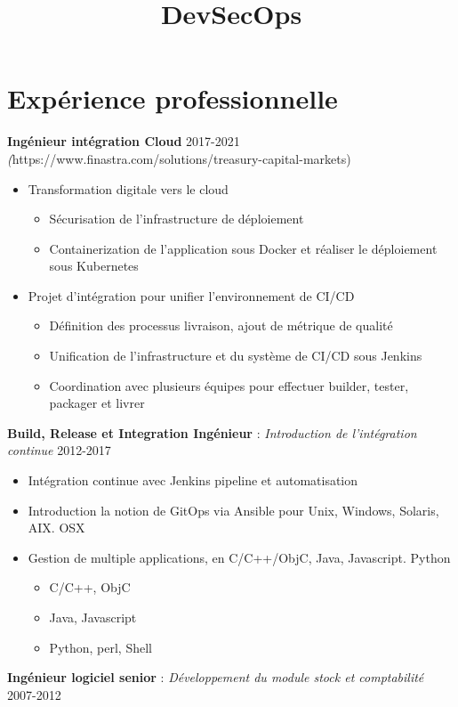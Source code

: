 \documentclass[11pt,a4paper]{moderncv}
\title{DevSecOps}
\begin{document}
	
\makecvtitle

\section{Expérience professionnelle}


{
\bigskip
\textbf{Ingénieur intégration Cloud} \hfill 2017-2021
\textit(https://www.finastra.com/solutions/treasury-capital-markets)
\bigskip
	\begin{itemize}%
		\item Transformation digitale vers le cloud  
			\begin{itemize}%
				\item Sécurisation de l'infrastructure de déploiement
				\item Containerization de l'application sous Docker et réaliser le déploiement sous Kubernetes
			\end{itemize}
	\end{itemize}
\bigskip
	\begin{itemize}%
	\item	Projet d’intégration pour unifier l'environnement de CI/CD
		\begin{itemize}%
				\item Définition des processus livraison, ajout de métrique de qualité
				\item Unification de l'infrastructure et du système de CI/CD sous Jenkins
				\item Coordination avec plusieurs équipes pour effectuer builder, tester, packager  et livrer
		\end{itemize}
	\end{itemize}
\bigskip
 \textbf{Build, Release et Integration Ingénieur} : \textit{Introduction de l'intégration continue} \hfill 2012-2017
\bigskip
			\begin{itemize}%
				\item Intégration continue avec Jenkins pipeline et automatisation
                \item Introduction la notion de GitOps via Ansible pour Unix, Windows, Solaris, AIX. OSX
				\item Gestion de multiple applications, en C/C++/ObjC, Java, Javascript. Python
					\begin{itemize}	
						\item C/C++, ObjC
						\item Java, Javascript
						\item Python, perl, Shell
					\end{itemize}				
				\end{itemize}
\bigskip
\textbf{Ingénieur logiciel senior} : \textit{Développement du module stock et comptabilité} \hfill 2007-2012

}
\end{document}
